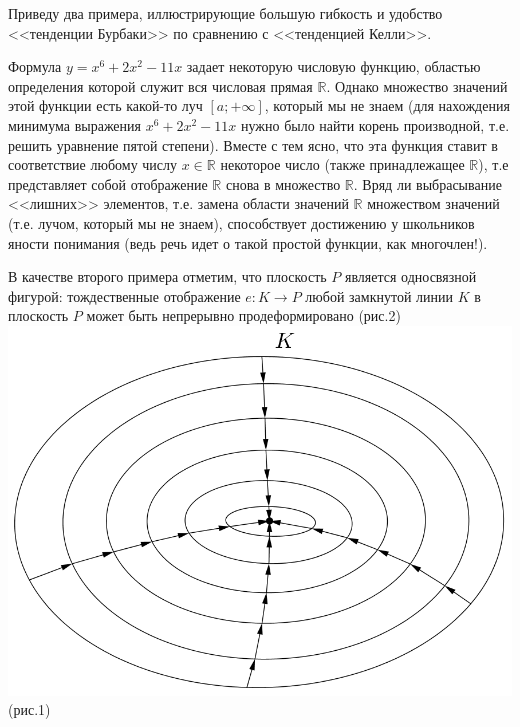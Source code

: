 \documentclass{article}
\begin{document}
\par Приведу два примера, иллюстрирующие большую гибкость и удобство <<тенденции Бурбаки>> по сравнению с <<тенденцией Келли>>.
\par Формула $y=x^6+2x^2-11x$ задает некоторую числовую функцию, областью определения которой служит вся числовая прямая $\mathbb{R}$. Однако множество значений этой функции есть какой-то луч $[a;+\infty]$, который мы не знаем (для нахождения минимума выражения $x^6+2x^2-11x$ нужно было найти корень производной, т.е. решить уравнение пятой степени). Вместе с тем ясно, что эта функция ставит в соответствие любому числу $x\in \mathbb{R}$ некоторое число (также принадлежащее $\mathbb{R}$), т.е представляет собой отображение $\mathbb{R}$ снова в множество $\mathbb{R}$. Вряд ли выбрасывание <<лишних>> элементов, т.е. замена области значений $\mathbb{R}$ множеством значений (т.е. лучом, который мы не знаем), способствует достижению у школьников яности понимания (ведь речь идет о такой простой функции, как многочлен!).
\par В качестве второго примера отметим, что плоскость $P$ является односвязной фигурой: тождественные отображение $e:K\to P$ любой замкнутой линии $K$ в плоскость $P$ может быть непрерывно продеформировано (рис.2)
\\
\includegraphics[scale=0.2]{k.png}(рис.1)
\end{document}
